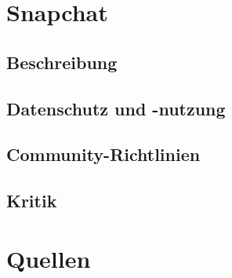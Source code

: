 \documentclass[a4paper,12pt]{scrartcl}
\begin{document}
\section{Snapchat}
\subsection{Beschreibung}

\subsection{Datenschutz und -nutzung}

\subsection{Community-Richtlinien}

\subsection{Kritik}



\pagebreak
\section{Quellen}

\end{document}
